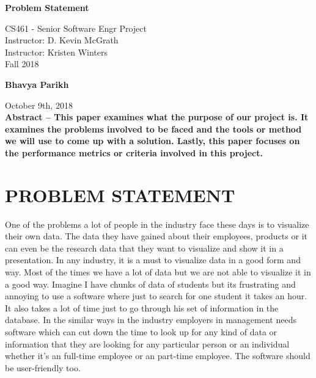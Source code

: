 \documentclass[letterpaper,10pt,titlepage, onecolumn]{IEEEtran}
\begin{document}
\begin{titlepage}
\begin{center}
  
  \textbf{}

  \vspace{6cm}
  \Huge{}
  \textbf{Problem Statement}
  \vspace{3cm}

 
  \LARGE
  CS461 - Senior Software Engr Project\\
  \vspace{0.25cm}
  Instructor: D. Kevin McGrath \\
  Instructor: Kristen Winters \\
  \vspace{0.25cm}
  Fall 2018 \\
  \vspace{1.5cm}
  
  \textbf{Bhavya Parikh}
  \date{October 9th, 2018}
  \vfill
  October 9th, 2018\\
  \vspace{1cm}
  \vspace*{\fill}
   \textbf{Abstract -- This paper examines what the purpose of our project is. It examines the problems involved to be faced and the tools or method we will use to come up with a solution. Lastly, this paper focuses on the performance metrics or criteria involved in this project.}
  \end{center}
  \end{titlepage}
  
\section{PROBLEM STATEMENT}

    One of the problems a lot of people in the industry face these days is to visualize their own data. The data they have gained about their employees, products or it can even be the research data that they want to visualize and show it in a presentation. In any industry, it is a must to visualize data in a good form and way. Most of the times we have a lot of data but we are not able to visualize it in a good way. Imagine I have chunks of data of students but its frustrating and annoying to use a software where just to search for one student it takes an hour. It also takes a lot of time just to go through his set of information in the database. In the similar ways in the industry employers in management needs software which can cut down the time to look up for any kind of data or information that they are looking for any particular person or an individual whether it’s an full-time employee or an part-time employee. The software should be user-friendly too.\\
\end{document}
